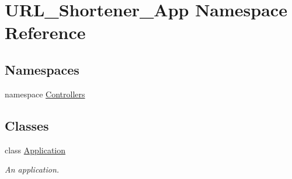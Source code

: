 \hypertarget{namespace_u_r_l___shortener___app}{}\section{U\+R\+L\+\_\+\+Shortener\+\_\+\+App Namespace Reference}
\label{namespace_u_r_l___shortener___app}
\subsection*{Namespaces}
\begin{DoxyCompactItemize}
\item 
namespace \hyperlink{namespace_u_r_l___shortener___app_1_1_controllers}{Controllers}
\end{DoxyCompactItemize}
\subsection*{Classes}
\begin{DoxyCompactItemize}
\item 
class \hyperlink{class_u_r_l___shortener___app_1_1_application}{Application}
\begin{DoxyCompactList}\small\item\em An application. \end{DoxyCompactList}\end{DoxyCompactItemize}
